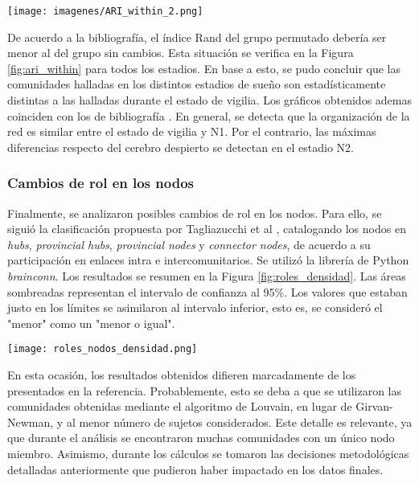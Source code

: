 \documentclass[a4paper,10pt,twocolumn,spanish]{article}
\begin{document}
\begin{figure*}[htb]
\centering
\texttt{[image: imagenes/ARI\_within\_2.png]}
\caption{ARI \textit{within group} versus densidad}
\label{fig:ari_within}
\end{figure*}

De acuerdo a la bibliografía, el índice Rand del grupo permutado debería ser menor al del grupo sin cambios. Esta situación se verifica en la Figura \ref{fig:ari_within} para todos los estadios. En base a esto, se pudo concluir que las comunidades halladas en los distintos estadios de sueño son estadísticamente distintas a las halladas durante el estado de vigilia. Los gráficos obtenidos ademas coinciden con los de bibliografía \cite{ref3}. En general, se detecta que la organización de la red es similar entre el estado de vigilia y N1. Por el contrario, las máximas diferencias respecto del cerebro despierto se detectan en el estadio N2.

\subsubsection{Cambios de rol en los nodos}

Finalmente, se analizaron posibles cambios de rol en los nodos. Para ello, se siguió la clasificación propuesta por Tagliazucchi et al \cite{ref3}, catalogando los nodos en \textit{hubs}, \textit{provincial hubs}, \textit{provincial nodes} y \textit{connector nodes}, de acuerdo a su participación en enlaces intra e intercomunitarios. Se utilizó la librería de Python \textit{brainconn}. Los resultados se resumen en la Figura \ref{fig:roles_densidad}. Las áreas sombreadas representan el intervalo de confianza al 95\%. Los valores que estaban justo en los límites se asimilaron al intervalo inferior, esto es, se consideró el "menor" como un "menor o igual".

\begin{figure*}[htb]
\centering
\texttt{[image: roles\_nodos\_densidad.png]}
\caption{Roles de nodos}
\label{fig:roles_densidad}
\end{figure*}

En esta ocasión, los resultados obtenidos difieren marcadamente de los presentados en la referencia. Probablemente, esto se deba a que se utilizaron las comunidades obtenidas mediante el algoritmo de Louvain, en lugar de Girvan-Newman, y al menor número de sujetos considerados. Este detalle es relevante, ya que durante el análisis se encontraron muchas comunidades con un único nodo miembro. Asimismo, durante los cálculos se tomaron las decisiones metodológicas detalladas anteriormente que pudieron haber impactado en los datos finales. 
\end{document}
